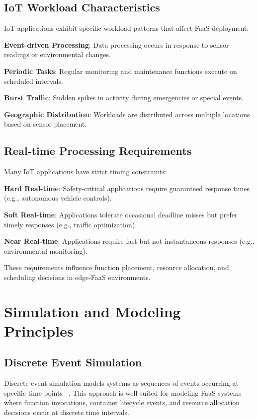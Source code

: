 \subsection{IoT Workload Characteristics}

IoT applications exhibit specific workload patterns that affect FaaS deployment:

\textbf{Event-driven Processing}: Data processing occurs in response to sensor readings or environmental changes.

\textbf{Periodic Tasks}: Regular monitoring and maintenance functions execute on scheduled intervals.

\textbf{Burst Traffic}: Sudden spikes in activity during emergencies or special events.

\textbf{Geographic Distribution}: Workloads are distributed across multiple locations based on sensor placement.

\subsection{Real-time Processing Requirements}

Many IoT applications have strict timing constraints:

\textbf{Hard Real-time}: Safety-critical applications require guaranteed response times (e.g., autonomous vehicle controls).

\textbf{Soft Real-time}: Applications tolerate occasional deadline misses but prefer timely responses (e.g., traffic optimization).

\textbf{Near Real-time}: Applications require fast but not instantaneous responses (e.g., environmental monitoring).

These requirements influence function placement, resource allocation, and scheduling decisions in edge-FaaS environments.

\section{Simulation and Modeling Principles}

\subsection{Discrete Event Simulation}

Discrete event simulation models systems as sequences of events occurring at specific time points ~\cite{mahmoudi2021simfaas}. This approach is well-suited for modeling FaaS systems where function invocations, container lifecycle events, and resource allocation decisions occur at discrete time intervals.

